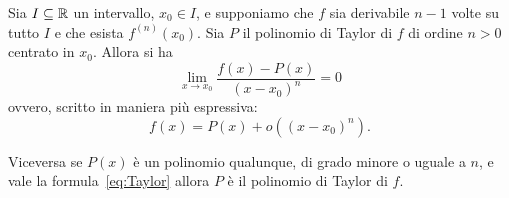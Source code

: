 \begin{theorem}
\label{th:taylor_peano}%
\mymark{***}%
%
%
%
Sia $I\subseteq {\mathbb R}$ un intervallo, $x_0\in I$, 
e supponiamo che $f$ sia derivabile $n-1$ volte su tutto $I$
e che esista $f^{(n)}(x_0)$.
%
Sia $P$ il polinomio di Taylor di $f$ di ordine $n>0$ centrato in $x_0$. 
Allora si ha
\begin{equation}\label{eq:taylor_peano}
  \lim_{x\to x_0}\frac{f(x) - P(x)}{(x-x_0)^n} = 0
\end{equation}
ovvero, scritto in maniera più espressiva:
\begin{equation}\label{eq:Taylor}
  f(x) = P(x) + o((x-x_0)^n).
\end{equation}

Viceversa se $P(x)$ è un polinomio qualunque, di grado minore o uguale a $n$, e vale la
formula~\eqref{eq:Taylor} allora $P$ è il polinomio di Taylor di $f$.
\end{theorem}
%
